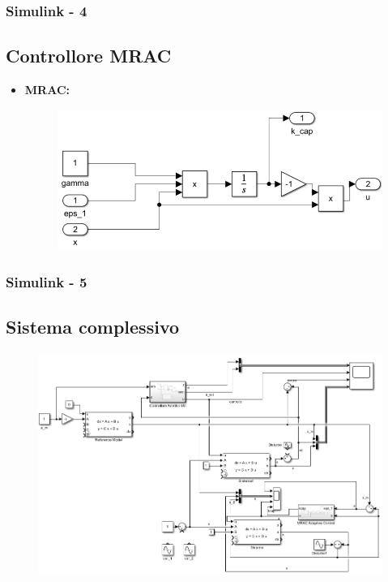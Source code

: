 \documentclass{beamer}
\begin{document}
\begin{frame}
	\frametitle{Simulink - 4}%
	\subsection{Controllore MRAC}
	\begin{itemize}
		\item \textbf{MRAC:}
		\begin{figure}
			\includegraphics[scale=0.4]{2022-05-19-18-40-36.png}%
		\end{figure}
	\end{itemize}
\end{frame}
\begin{frame}
	\frametitle{Simulink - 5}%
	\subsection{Sistema complessivo}
\begin{figure}[t]
	\includegraphics[scale=0.35]{2022-05-20-11-05-07.png}%
\end{figure}
\end{frame}
\end{document}
